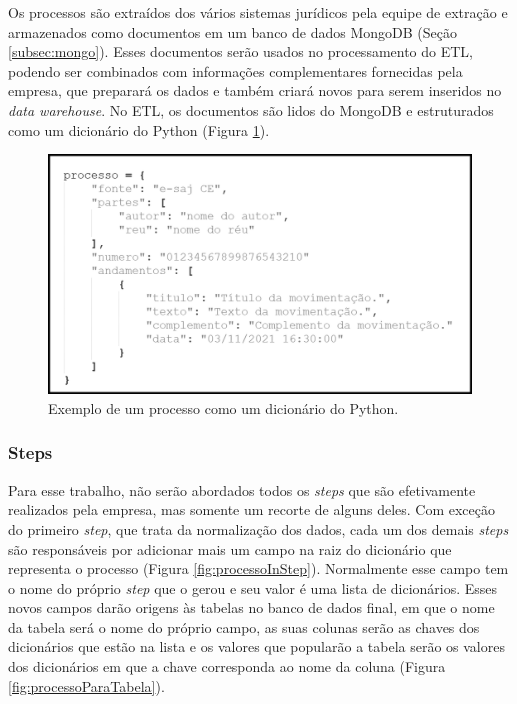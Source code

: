 Os processos são extraídos dos vários sistemas jurídicos pela equipe de extração e armazenados como documentos em um banco de dados MongoDB (Seção \ref{subsec:mongo}). Esses documentos serão usados no processamento do ETL, podendo ser combinados com informações complementares fornecidas pela empresa, que preparará os dados e também criará novos para serem inseridos no \textit{data warehouse}. No ETL, os documentos são lidos do MongoDB e estruturados como um dicionário do Python (Figura \ref{fig:processoPython}).

\begin{figure}[ht]
\centering
\includegraphics[width=1\textwidth]{imagens/processo-python.png}
\caption{Exemplo de um processo como um dicionário do Python.}
\label{fig:processoPython}
\end{figure}


\subsubsection{Steps}
\label{steps}

Para esse trabalho, não serão abordados todos os \textit{steps} que são efetivamente realizados pela empresa, mas somente um recorte de alguns deles. Com exceção do primeiro \textit{step}, que trata da normalização dos dados, cada um dos demais \textit{steps} são responsáveis por adicionar mais um campo na raiz do dicionário que representa o processo (Figura \ref{fig:processoInStep}). Normalmente esse campo tem o nome do próprio \textit{step} que o gerou e seu valor é uma lista de dicionários. Esses novos campos darão origens às tabelas no banco de dados final, em que o nome da tabela será o nome do próprio campo, as suas colunas serão as chaves dos dicionários que estão na lista e os valores que popularão a tabela serão os valores dos dicionários em que a chave corresponda ao nome da coluna (Figura \ref{fig:processoParaTabela}).

